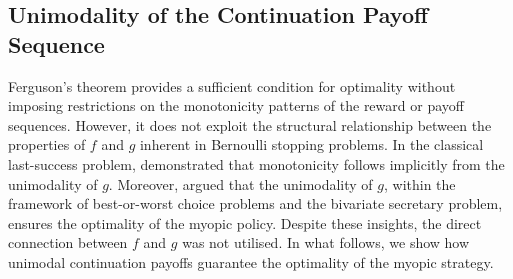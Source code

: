\documentclass[11pt]{article}
\begin{document}
\subsection{Unimodality of the Continuation Payoff Sequence}
Ferguson's theorem provides a sufficient condition for optimality without imposing restrictions on the monotonicity patterns of the reward or payoff sequences. However,  it does not exploit the  structural relationship between the properties of $f$  and  $g$ inherent in Bernoulli stopping problems.  In the classical last-success problem, \cite{Odds} demonstrated  that monotonicity  follows implicitly from the unimodality of  $g$. Moreover,  \cite{FergusonDependent} argued that the unimodality of $g$, within the framework of best-or-worst choice problems and the bivariate secretary problem, ensures the optimality of the myopic policy. Despite these insights, the direct connection between  $f$ and $g$ was not utilised.  In what follows, we show how unimodal continuation payoffs guarantee the optimality of the myopic strategy.
%
%
%
%
\end{document}
